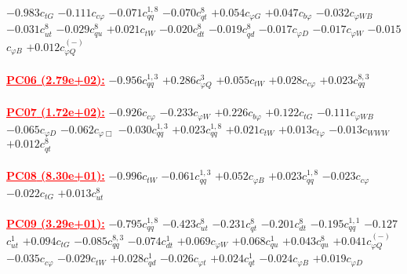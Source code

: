 \documentclass{article}
\begin{document}
{$-0.983$}{\rm $c_{tG}$} 
{$-0.111$}{\rm $c_{c \varphi}$} 
{$-0.071$}{\rm $c_{qq}^{1,8}$} 
{$-0.070$}{\rm $c_{qt}^{8}$} 
{$+0.054$}{\rm $c_{\varphi G}$} 
{$+0.047$}{\rm $c_{b \varphi}$} 
{$-0.032$}{\rm $c_{\varphi WB}$} 
{$-0.031$}{\rm $c_{ut}^{8}$} 
{$-0.029$}{\rm $c_{qu}^{8}$} 
{$+0.021$}{\rm $c_{tW}$} 
{$-0.020$}{\rm $c_{dt}^{8}$} 
{$-0.019$}{\rm $c_{qd}^{8}$} 
{$-0.017$}{\rm $c_{\varphi D}$} 
{$-0.017$}{\rm $c_{\varphi W}$} 
{$-0.015$}{\rm $c_{\varphi B}$} 
{$+0.012$}{\rm $c_{\varphi Q}^{(-)}$} 
 \nonumber \\ \nonumber \\ 
\noindent \textcolor{red}{\underline{\bf{PC06} (2.79e+02):}}
{$-0.956$}{\rm $c_{qq}^{1,3}$} 
{$+0.286$}{\rm $c_{\varphi Q}^{3}$} 
{$+0.055$}{\rm $c_{tW}$} 
{$+0.028$}{\rm $c_{c \varphi}$} 
{$+0.023$}{\rm $c_{qq}^{8,3}$} 
 \nonumber \\ \nonumber \\ 
\noindent \textcolor{red}{\underline{\bf{PC07} (1.72e+02):}}
{$-0.926$}{\rm $c_{c \varphi}$} 
{$-0.233$}{\rm $c_{\varphi W}$} 
{$+0.226$}{\rm $c_{b \varphi}$} 
{$+0.122$}{\rm $c_{tG}$} 
{$-0.111$}{\rm $c_{\varphi WB}$} 
{$-0.065$}{\rm $c_{\varphi D}$} 
{$-0.062$}{\rm $c_{\varphi \Box}$} 
{$-0.030$}{\rm $c_{qq}^{1,3}$} 
{$+0.023$}{\rm $c_{qq}^{1,8}$} 
{$+0.021$}{\rm $c_{tW}$} 
{$+0.013$}{\rm $c_{t \varphi}$} 
{$-0.013$}{\rm $c_{WWW}$} 
{$+0.012$}{\rm $c_{qt}^{8}$} 
 \nonumber \\ \nonumber \\ 
\noindent \textcolor{red}{\underline{\bf{PC08} (8.30e+01):}}
{$-0.996$}{\rm $c_{tW}$} 
{$-0.061$}{\rm $c_{qq}^{1,3}$} 
{$+0.052$}{\rm $c_{\varphi B}$} 
{$+0.023$}{\rm $c_{qq}^{1,8}$} 
{$-0.023$}{\rm $c_{c \varphi}$} 
{$-0.022$}{\rm $c_{tG}$} 
{$+0.013$}{\rm $c_{ut}^{8}$} 
 \nonumber \\ \nonumber \\ 
\noindent \textcolor{red}{\underline{\bf{PC09} (3.29e+01):}}
{$-0.795$}{\rm $c_{qq}^{1,8}$} 
{$-0.423$}{\rm $c_{ut}^{8}$} 
{$-0.231$}{\rm $c_{qt}^{8}$} 
{$-0.201$}{\rm $c_{dt}^{8}$} 
{$-0.195$}{\rm $c_{qq}^{1,1}$} 
{$-0.127$}{\rm $c_{ut}^{1}$} 
{$+0.094$}{\rm $c_{tG}$} 
{$-0.085$}{\rm $c_{qq}^{8,3}$} 
{$-0.074$}{\rm $c_{dt}^{1}$} 
{$+0.069$}{\rm $c_{\varphi W}$} 
{$+0.068$}{\rm $c_{qu}^{1}$} 
{$+0.043$}{\rm $c_{qu}^{8}$} 
{$+0.041$}{\rm $c_{\varphi Q}^{(-)}$} 
{$-0.035$}{\rm $c_{c \varphi}$} 
{$-0.029$}{\rm $c_{tW}$} 
{$+0.028$}{\rm $c_{qd}^{1}$} 
{$-0.026$}{\rm $c_{\varphi t}$} 
{$+0.024$}{\rm $c_{qt}^{1}$} 
{$-0.024$}{\rm $c_{\varphi B}$} 
{$+0.019$}{\rm $c_{\varphi D}$} 
 \nonumber \\ \nonumber \\ 
\end{document}

